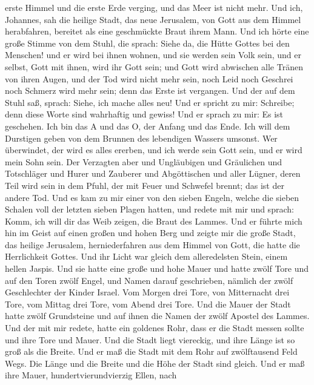 erste Himmel und die erste Erde verging, und das Meer ist nicht mehr.
 Und ich, Johannes, sah die heilige Stadt, das neue
Jerusalem, von Gott aus dem Himmel herabfahren, bereitet als eine
geschmückte Braut ihrem Mann.  Und ich hörte eine große
Stimme von dem Stuhl, die sprach: Siehe da, die Hütte Gottes bei den
Menschen! und er wird bei ihnen wohnen, und sie werden sein Volk sein,
und er selbst, Gott mit ihnen, wird ihr Gott sein;  und Gott
wird abwischen alle Tränen von ihren Augen, und der Tod wird nicht mehr
sein, noch Leid noch Geschrei noch Schmerz wird mehr sein; denn das
Erste ist vergangen.  Und der auf dem Stuhl saß, sprach:
Siehe, ich mache alles neu! Und er spricht zu mir: Schreibe; denn diese
Worte sind wahrhaftig und gewiss!  Und er sprach zu mir: Es
ist geschehen. Ich bin das A und das O, der Anfang und das Ende. Ich
will dem Durstigen geben von dem Brunnen des lebendigen Wassers umsonst.
 Wer überwindet, der wird es alles ererben, und ich werde
sein Gott sein, und er wird mein Sohn sein.  Der Verzagten
aber und Ungläubigen und Gräulichen und Totschläger und Hurer und
Zauberer und Abgöttischen und aller Lügner, deren Teil wird sein in dem
Pfuhl, der mit Feuer und Schwefel brennt; das ist der andere Tod.
 Und es kam zu mir einer von den sieben Engeln, welche die
sieben Schalen voll der letzten sieben Plagen hatten, und redete mit mir
und sprach: Komm, ich will dir das Weib zeigen, die Braut des Lammes.
 Und er führte mich hin im Geist auf einen großen und hohen
Berg und zeigte mir die große Stadt, das heilige Jerusalem,
herniederfahren aus dem Himmel von Gott,  die hatte die
Herrlichkeit Gottes. Und ihr Licht war gleich dem alleredelsten Stein,
einem hellen Jaspis.  Und sie hatte eine große und hohe
Mauer und hatte zwölf Tore und auf den Toren zwölf Engel, und Namen
darauf geschrieben, nämlich der zwölf Geschlechter der Kinder Israel.
 Vom Morgen drei Tore, von Mitternacht drei Tore, vom
Mittag drei Tore, vom Abend drei Tore.  Und die Mauer der
Stadt hatte zwölf Grundsteine und auf ihnen die Namen der zwölf Apostel
des Lammes.  Und der mit mir redete, hatte ein goldenes
Rohr, dass er die Stadt messen sollte und ihre Tore und Mauer.
 Und die Stadt liegt viereckig, und ihre Länge ist so groß
als die Breite. Und er maß die Stadt mit dem Rohr auf zwölftausend Feld
Wegs. Die Länge und die Breite und die Höhe der Stadt sind gleich.
 Und er maß ihre Mauer, hundertvierundvierzig Ellen, nach
